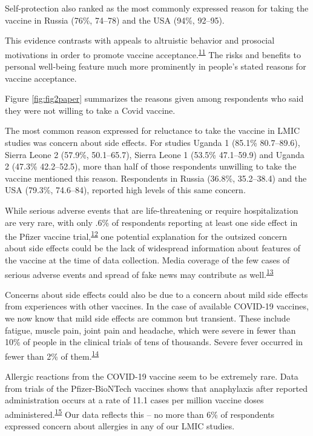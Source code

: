 \documentclass[
  12pt,
]{article}
\begin{document}
Self-protection also ranked as the most commonly expressed reason for taking the vaccine in Russia (76\%, 74--78) and the USA (94\%, 92--95).

This evidence contrasts with appeals to altruistic behavior and prosocial motivations in order to promote vaccine acceptance.\textsuperscript{\protect\hyperlink{ref-chou2020considering}{11}} The risks and benefits to personal well-being feature much more prominently in people's stated reasons for vaccine acceptance.

Figure \ref{fig:fig2paper} summarizes the reasons given among respondents who said they were not willing to take a Covid vaccine.

The most common reason expressed for reluctance to take the vaccine in LMIC studies was concern about side effects. For studies Uganda 1 (85.1\% 80.7--89.6), Sierra Leone 2 (57.9\%, 50.1--65.7), Sierra Leone 1 (53.5\% 47.1--59.9) and Uganda 2 (47.3\% 42.2--52.5), more than half of those respondents unwilling to take the vaccine mentioned this reason. Respondents in Russia (36.8\%, 35.2--38.4) and the USA (79.3\%, 74.6--84), reported high levels of this same concern.

While serious adverse events that are life-threatening or require hospitalization are very rare, with only .6\% of respondents reporting at least one side effect in the Pfizer vaccine trial,\textsuperscript{\protect\hyperlink{ref-cdcadverse}{12}} one potential explanation for the outsized concern about side effects could be the lack of widespread information about features of the vaccine at the time of data collection. Media coverage of the few cases of serious adverse events and spread of fake news may contribute as well.\textsuperscript{\protect\hyperlink{ref-stein2017golden}{13}}

Concerns about side effects could also be due to a concern about mild side effects from experiences with other vaccines. In the case of available COVID-19 vaccines, we now know that mild side effects are common but transient. These include fatigue, muscle pain, joint pain and headache, which were severe in fewer than 10\% of people in the clinical trials of tens of thousands. Severe fever occurred in fewer than 2\% of them.\textsuperscript{\protect\hyperlink{ref-wadman2020public}{14}}

Allergic reactions from the COVID-19 vaccine seem to be extremely rare. Data from trials of the Pfizer-BioNTech vaccines shows that anaphylaxis after reported administration occurs at a rate of 11.1 cases per million vaccine doses administered.\textsuperscript{\protect\hyperlink{ref-cdcallergies}{15}} Our data reflects this -- no more than 6\% of respondents expressed concern about allergies in any of our LMIC studies.
\end{document}
